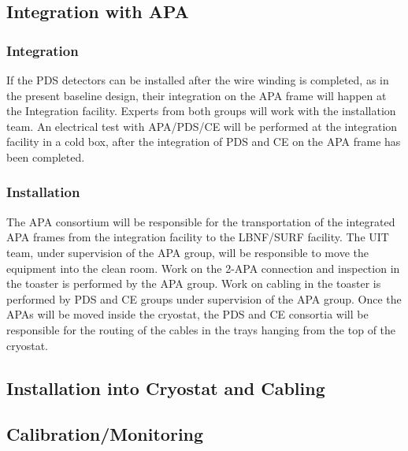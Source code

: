 \subsection{Integration with APA}
\label{sec:fdsp-pd-install-pd-apa}


\subsubsection{Integration}
If the PDS detectors can be installed after the wire winding is completed, as in the present baseline design, their integration on the APA frame will happen at the Integration facility. Experts from both groups will work with the installation team. 
An electrical test with APA/PDS/CE will be performed at the integration facility in a cold box, after the integration of PDS and CE on the APA frame has been completed.

\subsubsection{Installation}
The APA consortium will be responsible for the transportation of the integrated APA frames from the integration facility to the LBNF/SURF facility. 
The UIT team, under supervision of the APA group, will be responsible to move the equipment into the clean room. 
Work on the 2-APA connection and inspection in the toaster is performed by the APA group.
Work on cabling in the toaster is performed by PDS and CE groups under supervision of the APA group.
Once the APAs will be moved inside the cryostat, the PDS and CE consortia will be responsible for the routing of the cables in the trays hanging from the top of the cryostat. 


\subsection{\color{red}\bf Installation into Cryostat and Cabling}
\label{sec:fdsp-pd-install-pd-cryo}

\subsection{Calibration/Monitoring}
\label{sec:fdsp-pd-install-calib}

